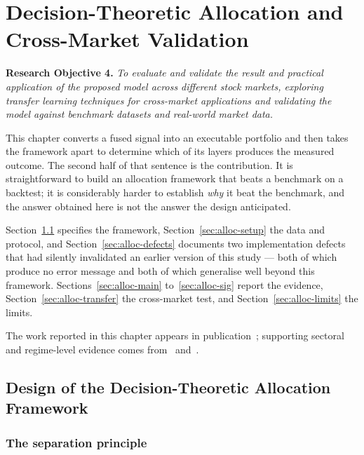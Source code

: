 \chapter{Decision-Theoretic Allocation and Cross-Market Validation}
\label{ch:allocation}

\textbf{Research Objective 4.} \emph{To evaluate and validate the result and practical
application of the proposed model across different stock markets, exploring transfer learning
techniques for cross-market applications and validating the model against benchmark datasets and
real-world market data.}

\vspace{0.4em}
This chapter converts a fused signal into an executable portfolio and then takes the framework
apart to determine which of its layers produces the measured outcome. The second half of that
sentence is the contribution. It is straightforward to build an allocation framework that beats a
benchmark on a backtest; it is considerably harder to establish \emph{why} it beat the benchmark,
and the answer obtained here is not the answer the design anticipated.

Section~\ref{sec:alloc-design} specifies the framework, Section~\ref{sec:alloc-setup} the data and
protocol, and Section~\ref{sec:alloc-defects} documents two implementation defects that had
silently invalidated an earlier version of this study --- both of which produce no error message
and both of which generalise well beyond this framework. Sections~\ref{sec:alloc-main}
to~\ref{sec:alloc-sig} report the evidence, Section~\ref{sec:alloc-transfer} the cross-market
test, and Section~\ref{sec:alloc-limits} the limits.

The work reported in this chapter appears in publication~; supporting sectoral and
regime-level evidence comes from~ and~.

\section{Design of the Decision-Theoretic Allocation Framework}
\label{sec:alloc-design}

\subsection{The separation principle}

